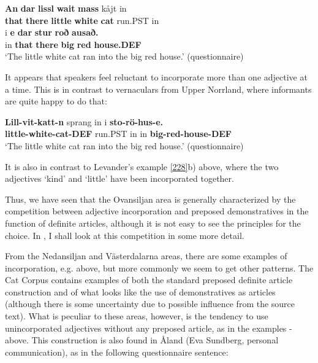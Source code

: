 \ea\label{}
\gll \textbf{An} \textbf{dar} \textbf{lissl} \textbf{wait} \textbf{mass} kåjt  in\\
\textbf{that} \textbf{there} \textbf{little} \textbf{white} \textbf{cat} run.PST  in\\
\gll i  \textbf{e}\textbf{  dar}\textbf{  stur}\textbf{  roð}\textbf{  ausað.}\\
in  \textbf{that} \textbf{there} \textbf{big} \textbf{red} \textbf{house.DEF}\\
\glt ‘The little white cat ran into the big red house.’ (questionnaire)
\z

It appears that speakers feel reluctant to incorporate more than one adjective at a time. This is in contrast to vernaculars from Upper Norrland, where informants are quite happy to do that:

\ea\label{}
\gll \textbf{Lill-vit-katt-n} sprang  in  i  \textbf{sto-rö-hus-e.}\\
\textbf{little-white-cat-DEF} run.PST  in  in  \textbf{big-red-house-DEF}\\
\glt ‘The little white cat ran into the big red house.’ (questionnaire)
\z

It is also in contrast to Levander’s example \ref{228}b) above, where the two adjectives  ‘kind’ and  ‘little’ have been incorporated together. 

Thus, we have seen that the Ovansiljan area is generally characterized by the competition between adjective incorporation and preposed demonstratives in the function of definite articles, although it is not easy to see the principles for the choice. In , I shall look at this competition in some more detail.

From the Nedansiljan and Västerdalarna areas, there are some examples of incorporation, e.g.  above, but more commonly we seem to get other patterns. The Cat Corpus contains examples of both the standard preposed definite article construction and of what looks like the use of demonstratives as articles (although there is some uncertainty due to possible influence from the source text). What is peculiar to these areas, however, is the tendency to use unincorporated adjectives without any preposed article, as in the examples - above. This construction is also found in Åland (Eva Sundberg, personal communication), as in the following questionnaire sentence:

